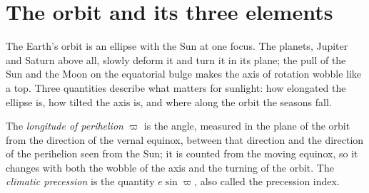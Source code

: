 \section{The orbit and its three elements}\label{sec:b2:orbital-forcing:elements}

The Earth's orbit is an ellipse with the Sun at one focus. The planets, Jupiter and Saturn above
all, slowly deform it and turn it in its plane; the pull of the Sun and the Moon on the equatorial
bulge makes the axis of rotation wobble like a top. Three quantities describe what matters for
sunlight: how elongated the ellipse is, how tilted the axis is, and where along the orbit the
seasons fall.

\begin{definition}\label{def:b2:orbital-forcing:elements}
The \emph{longitude of perihelion} $\varpi$ is the angle, measured in
the plane of the orbit from the direction of the vernal equinox, between that direction and the
direction of the perihelion seen from the Sun; it is counted from the moving equinox, so it
changes with both the wobble of the axis and the turning of the orbit. The \emph{climatic
precession} is the quantity $e\sin\varpi$, also called the precession
index.
\end{definition}

